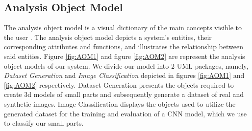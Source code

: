 \newpage
\begin{usecase}





\end{usecase}

\newpage
\subsection{Analysis Object Model}\label{analysis_object_model}
The analysis object model is a visual dictionary of the main concepts visible to the user \cite{bruegge2004object}. The analysis object model depicts a system's entities, their corresponding attributes and functions, and illustrates the relationship between said entities. Figure \ref{fig:AOM1} and figure \ref{fig:AOM2} are represent the analysis object models of our system. We divide our model into 2 UML packages, namely, \textit{Dataset Generation} and \textit{Image Classification} depicted in figures \ref{fig:AOM1} and \ref{fig:AOM2} respectively. Dataset Generation presents the objects required to create 3d models of small parts and subsequently generate a dataset of real and synthetic images. Image Classification displays the objects used to utilize the generated dataset for the training and evaluation of a CNN model, which we use to classify our small parts.

